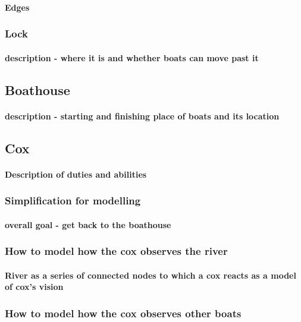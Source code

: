         \paragraph{Edges}
        
      \subsubsection{Lock}
        \paragraph{description - where it is and whether boats can move past it}
        
    \subsection{Boathouse}
      \paragraph{description - starting and finishing place of boats and its location}
    
    \subsection{Cox}
      \paragraph{Description of duties and abilities}
      \subsubsection{Simplification for modelling}
        \paragraph{overall goal - get back to the boathouse}
      \subsubsection{How to model how the cox observes the river}
        \paragraph{River as a series of connected nodes to which a cox reacts as a model of cox's vision}
      \subsubsection{How to model how the cox observes other boats}
